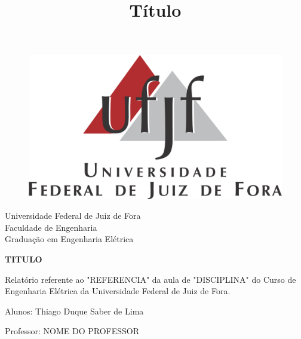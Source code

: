 \documentclass[a4paper, 12pt]{article}
\begin{document}

\begin{titlepage}
	\begin{center}
	
	\begin{figure}[!ht]
	\centering
	\includegraphics[width=0.5\linewidth]{ufjf.png}
	\end{figure}

		\Huge{Universidade Federal de Juiz de Fora}\\
		\large{Faculdade de Engenharia}\\ 
		\large{Graduação em Engenharia Elétrica}\\ 
\vspace{15pt}
        
        \vspace{85pt}
        
		\textbf{\LARGE{TITULO}}
		\title{\large{Título}}
			
	\end{center}
\vspace{1,5cm}
	
	\begin{flushright}

   \begin{list}{}{
      \setlength{\leftmargin}{4.5cm}
      \setlength{\rightmargin}{0cm}
      \setlength{\labelwidth}{0pt}
      \setlength{\labelsep}{\leftmargin}}

      \item Relatório referente ao "REFERENCIA" da aula de "DISCIPLINA" do Curso de Engenharia Elétrica da Universidade Federal de Juiz de Fora.

      \begin{list}{}{
      \setlength{\leftmargin}{0cm}
      \setlength{\rightmargin}{0cm}
      \setlength{\labelwidth}{0pt}
      \setlength{\labelsep}{\leftmargin}}

			\item Alunos: Thiago Duque Saber de Lima \\ \vspace{15pt}
            \item Professor: NOME DO PROFESSOR \


\end{list}
\end{list}
\end{flushright}
\end{titlepage}
\end{document}
